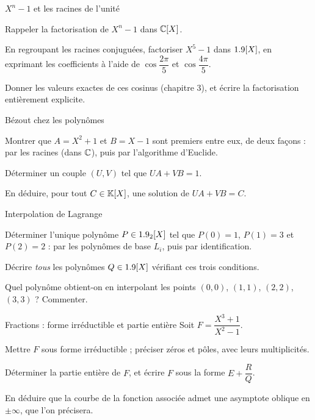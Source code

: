 \begin{exercice}[2]{$X^{n}-1$ et les racines de l'unité}
\begin{questions}
  \item Rappeler la factorisation de $X^{n}-1$ dans $\mathbb{C}[X]$.
  \item En regroupant les racines conjuguées, factoriser $X^{5}-1$ dans
    $1.9[X]$, en exprimant les coefficients à l'aide de
    $\cos\dfrac{2\pi}{5}$ et $\cos\dfrac{4\pi}{5}$.
  \item Donner les valeurs exactes de ces cosinus (chapitre 3), et écrire
    la factorisation entièrement explicite.
\end{questions}
\end{exercice}

\begin{exercice}[2]{Bézout chez les polynômes}
\begin{questions}
  \item Montrer que $A=X^{2}+1$ et $B=X-1$ sont premiers entre eux, de
    deux façons : par les racines (dans $\mathbb{C}$), puis par l'algorithme
    d'Euclide.
  \item Déterminer un couple $(U,V)$ tel que $UA+VB=1$.
  \item En déduire, pour tout $C\in\mathbb{K}[X]$, une solution de $UA+VB=C$.
\end{questions}
\end{exercice}

\begin{exercice}[2]{Interpolation de Lagrange}
\begin{questions}
  \item Déterminer l'unique polynôme $P\in1.9_2[X]$ tel que $P(0)=1$,
    $P(1)=3$ et $P(2)=2$ : par les polynômes de base $L_i$, puis par
    identification.
  \item Décrire \emph{tous} les polynômes $Q\in1.9[X]$ vérifiant ces trois
    conditions.
  \item Quel polynôme obtient-on en interpolant les points
    $(0,0)$, $(1,1)$, $(2,2)$, $(3,3)$ ? Commenter.
\end{questions}
\end{exercice}

\begin{exercice}[2]{Fractions : forme irréductible et partie entière}
Soit $F=\dfrac{X^{3}+1}{X^{2}-1}$.
\begin{questions}
  \item Mettre $F$ sous forme irréductible ; préciser zéros et pôles,
    avec leurs multiplicités.
  \item Déterminer la partie entière de $F$, et écrire $F$ sous la forme
    $E+\dfrac{R}{Q}$.
  \item En déduire que la courbe de la fonction associée admet une
    asymptote oblique en $\pm\infty$, que l'on précisera.
\end{questions}
\end{exercice}

